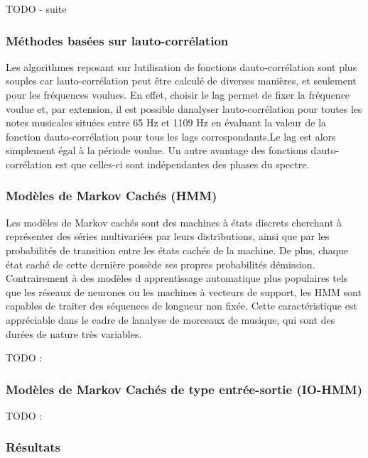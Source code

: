 \documentclass[letterpaper]{article}
\begin{document}
TODO - suite

\subsubsection{Méthodes basées sur l\textquotesingle auto-corrélation}

Les algorithmes reposant sur l\textquotesingle utilisation de fonctions d\textquotesingle auto-corrélation sont plus souples
car l\textquotesingle auto-corrélation peut être calculé de diverses manières, et seulement pour les fréquences voulues.
En effet, choisir le lag permet de fixer la fréquence voulue et, par extension, il est possible d\textquotesingle analyser
l\textquotesingle auto-corrélation pour toutes les notes musicales situées entre 65 Hz et 1109 Hz en évaluant la valeur
de la fonction d\textquotesingle auto-corrélation pour tous les lags correspondants.Le lag est alors simplement égal à la période
voulue. Un autre avantage des fonctions d\textquotesingle auto-corrélation est que celles-ci sont indépendantes des phases du spectre.

\subsubsection{Modèles de Markov Cachés (HMM)}

Les modèles de Markov cachés sont des machines à états discrets cherchant à représenter des séries multivariées par
leurs distributions, ainsi que par les probabilités de transition entre les états cachés de la machine. De plus, chaque état
caché de cette dernière possède ses propres probabilités d\textquotesingle émission. Contrairement à des modèles d\textquotesingle
apprentissage automatique plus populaires tels que les réseaux de neurones ou les machines à vecteurs de support,
les HMM sont capables de traiter des séquences de longueur non fixée. Cette caractéristique est appréciable dans le cadre
de l\textquotesingle analyse de morceaux de musique, qui sont des durées de nature très variables.

TODO : \citep{JP} \citep{DR}

\subsubsection{Modèles de Markov Cachés de type entrée-sortie (IO-HMM)}

TODO : \citep{YB}

\subsubsection{Résultats}
\end{document}
